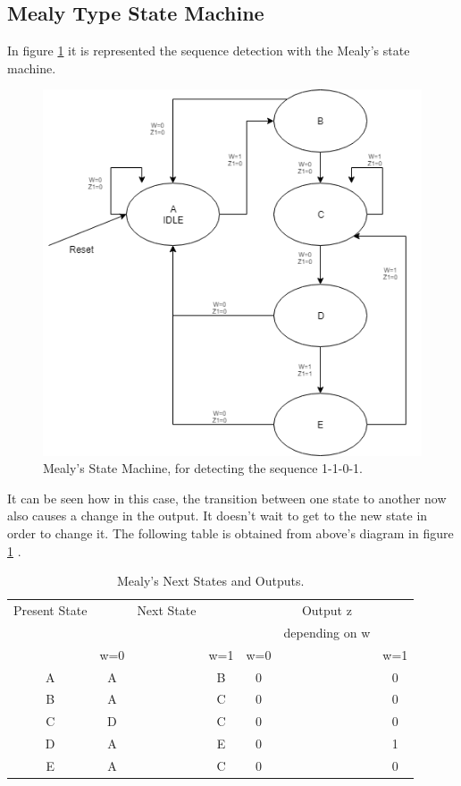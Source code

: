 \subsection{\color{purple}Mealy Type State Machine}

In figure \ref {MealyEFSM} it is represented the sequence detection with the Mealy's state machine.

\begin{figure}[H]
\centering
\includegraphics[scale=0.5]{../Exercise2/EJ2MEALY}
\caption{\color{cyan}Mealy's State Machine, for detecting the sequence 1-1-0-1.}
\label{MealyEFSM}
\end{figure}

It can be seen how in this case, the transition between one state to another now also causes a change in the output. It doesn't wait to get to the new state in order to change it. The following table is obtained from above's diagram in figure \ref {measej2} .
\begin{table}[H]
\begin{center}
\begin{tabular}{|c|c c c|c c c|}
\hline
Present State & & Next State & & & Output z & \\
 &  & & & & depending on w&  \\
 & w=0 & & w=1 & w=0& &w=1  \\
\hline
\hline
A & A & & B & 0 & & 0   \\
\hline
B & A & & C & 0 & & 0   \\
\hline
C & D & & C & 0 & & 0 \\
\hline
D & A & & E & 0 & & 1  \\
\hline
E & A & & C & 0 & & 0 \\
\hline
\hline
\end{tabular}
\end{center}
\caption{\label{measej2}\color{cyan}Mealy's Next States and Outputs.}
\end{table}
